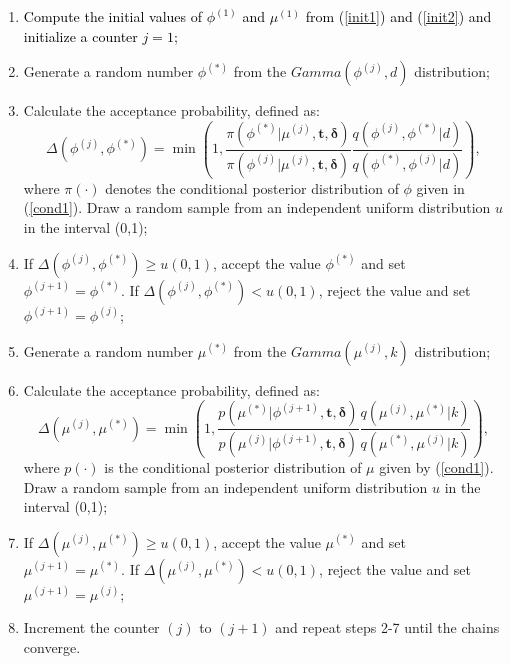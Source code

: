 \documentclass[]{interact}
\theoremstyle{plain}%
\theoremstyle{definition}
\theoremstyle{remark}
\begin{document}
\begin{enumerate}
\item \textcolor{black}{Compute the initial values of $\phi^{(1)}$ and $\mu^{(1)}$ from (\ref{init1}) and (\ref{init2}) and initialize a counter $j=1$;}
\item Generate a random number $\phi^{(*)}$ from the $Gamma(\phi^{(j)}, d)$ distribution;
\item Calculate the acceptance probability, defined as:
\begin{equation*}
\Delta\left(\phi^{(j)},\phi^{(*)}\right)=\min\left(1, \frac{\pi\left(\phi^{(*)}|\mu^{(j)},\boldsymbol{t,\delta}\right)}{\pi\left(\phi^{(j)}|\mu^{(j)},\boldsymbol{t,\delta}\right)} \frac{q\left(\phi^{(j)},\phi^{(*)}|d\right)}{q\left(\phi^{(*)},\phi^{(j)}|d\right)}\right),
\end{equation*}
where $\pi(\cdot)$ denotes the conditional posterior distribution of $\phi$ given in (\ref{cond1}). Draw a random sample from an independent uniform distribution $u$ in the interval (0,1);
\item If $\Delta\left(\phi^{(j)},\phi^{(*)}\right)\geq u(0,1)$, accept the value $\phi^{(*)}$ and set $\phi^{(j+1)}=\phi^{(*)}$. If $\Delta\left(\phi^{(j)},\phi^{(*)}\right)< u(0,1)$, reject the value and set $\phi^{(j+1)}=\phi^{(j)}$;

\item Generate a random number $\mu^{(*)}$ from the $Gamma(\mu^{(j)}, k)$ distribution;
\item Calculate the acceptance probability, defined as:
\begin{equation*}
\Delta\left(\mu^{(j)},\mu^{(*)}\right)=\min\left(1, \frac{p\left(\mu^{(*)}|\phi^{(j+1)},\boldsymbol{t,\delta}\right)}{p\left(\mu^{(j)}|\phi^{(j+1)},\boldsymbol{t,\delta}\right)} \frac{q\left(\mu^{(j)},\mu^{(*)}|k\right)}{q\left(\mu^{(*)},\mu^{(j)}|k\right)}\right),
\end{equation*}
where $p(\cdot)$ is the conditional posterior distribution of $\mu$ given by (\ref{cond1}). Draw a random sample from an independent uniform distribution $u$ in the interval (0,1);
\item If $\Delta\left(\mu^{(j)},\mu^{(*)}\right)\geq u(0,1)$, accept the value $\mu^{(*)}$ and set $\mu^{(j+1)}=\mu^{(*)}$. If $\Delta\left(\mu^{(j)},\mu^{(*)}\right)< u(0,1)$, reject the value and set $\mu^{(j+1)}=\mu^{(j)}$;

\item Increment the counter $(j)$ to $(j+1)$ and repeat steps 2-7 until the chains converge.
\end{enumerate}
\end{document}
